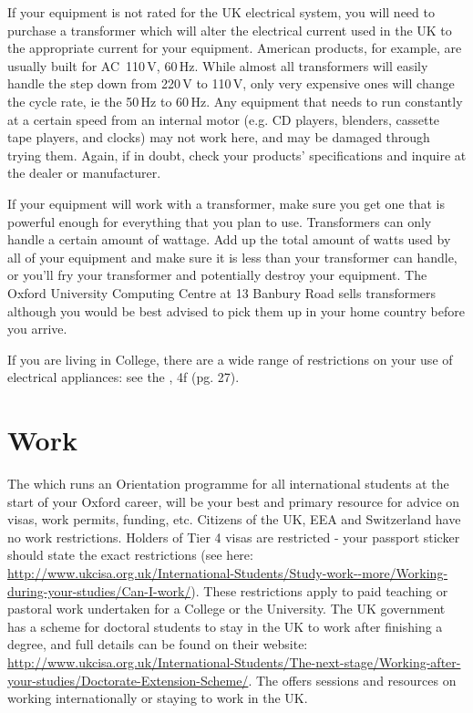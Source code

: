 If your equipment is not rated for the UK electrical system, you will need to
purchase a transformer which will alter the electrical current used in the UK to
the appropriate current for your equipment. American products, for example, are
usually built for AC~110\,V, 60\,Hz. While almost all transformers will easily
handle the step down from 220\,V to 110\,V, only very expensive ones will change
the cycle rate, ie the 50\,Hz to 60\,Hz. Any equipment that needs to run
constantly at a certain speed from an internal motor (e.g. CD players, blenders, cassette tape players, and clocks) may not work here, and may be damaged through trying them. Again, if in doubt, check your products' specifications and inquire at the dealer or manufacturer.

If your equipment will work with a transformer, make sure you get one that is powerful enough for everything that you plan to use. Transformers can only handle a certain amount of wattage. Add up the total amount of watts used by all of your equipment and make sure it is less than your transformer can handle, or you'll fry your transformer and potentially destroy your equipment. The Oxford University Computing Centre at 13 Banbury Road sells transformers although you would be best advised to pick them up in your home country before you arrive.

If you are living in College, there are a wide range of restrictions on your use
of electrical appliances: see the
\href{http://www.new.ox.ac.uk/sites/default/files/sites/all/files/HB_Web version_150115.pdf}{}, 4f (pg. 27).

\section{Work} 
The \href{http://www.ox.ac.uk/about/international-oxford}{} which runs an Orientation programme for all international students at the start of your Oxford career, will be your best and primary resource for advice on visas, work permits, funding, etc.
Citizens of the UK, EEA and Switzerland have no work restrictions. Holders of
Tier 4 visas are restricted - your passport sticker should state the exact
restrictions (see here:
\url{http://www.ukcisa.org.uk/International-Students/Study-work--more/Working-during-your-studies/Can-I-work/}). These restrictions apply to paid teaching or pastoral work undertaken for a College or the University.
The UK government has a scheme for doctoral students to stay in the UK to work
after finishing a degree, and full details can be found on their website:
\url{http://www.ukcisa.org.uk/International-Students/The-next-stage/Working-after-your-studies/Doctorate-Extension-Scheme/}.
The \href{http://www.careers.ox.ac.uk/}{} offers sessions and resources on working internationally or staying to work in the UK.

